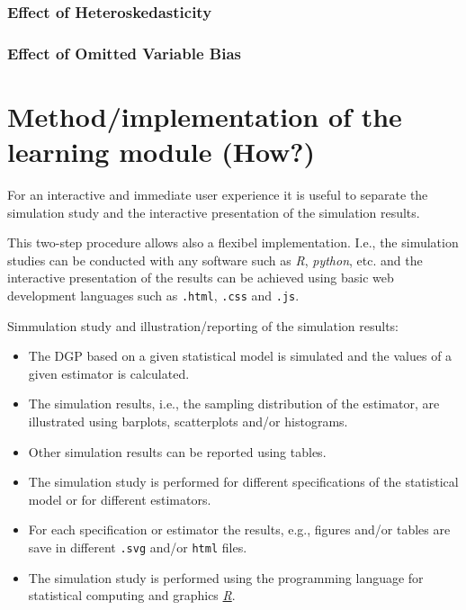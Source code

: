 \documentclass{article}
\begin{document}

\subsubsection{Effect of Heteroskedasticity}


\subsubsection{Effect of Omitted Variable Bias}






\section{Method/implementation of the learning module (How?)}

For an interactive and immediate user experience it is useful to separate the simulation study and the interactive presentation of the simulation results. 

This two-step procedure allows also a flexibel implementation. I.e., the simulation studies can be conducted with any software such as \emph{R}, \emph{python}, etc. and the interactive presentation of the results can be achieved using basic web development languages such as \texttt{.html}, \texttt{.css} and \texttt{.js}.

Simmulation study and illustration/reporting of the simulation results:

\begin{itemize}
	\item The DGP based on a given statistical model is simulated and the values of a given estimator is calculated.
	\item The simulation results, i.e., the sampling distribution of the estimator, are illustrated using  barplots, scatterplots and/or histograms.
	\item Other simulation results can be reported using tables.
	\item The simulation study is performed for different specifications of the statistical model or for different estimators.
	\item For each specification or estimator the results, e.g., figures and/or tables are save in different \texttt{.svg} and/or \texttt{html} files.
	\item The simulation study is performed using the programming language for statistical computing and graphics \href{https://www.r-project.org/}{\emph{R}}.	
\end{itemize}
\end{document}
